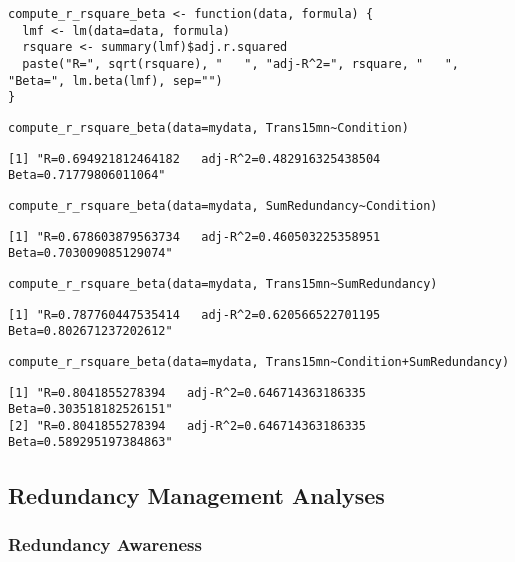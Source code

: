 \documentclass[10pt]{article}
\begin{document}
\begin{verbatim}
compute_r_rsquare_beta <- function(data, formula) {
  lmf <- lm(data=data, formula)
  rsquare <- summary(lmf)$adj.r.squared
  paste("R=", sqrt(rsquare), "   ", "adj-R^2=", rsquare, "   ", "Beta=", lm.beta(lmf), sep="")
}
\end{verbatim}

\begin{verbatim}
compute_r_rsquare_beta(data=mydata, Trans15mn~Condition)
\end{verbatim}

\begin{verbatim}
[1] "R=0.694921812464182   adj-R^2=0.482916325438504   Beta=0.71779806011064"
\end{verbatim}

\begin{verbatim}
compute_r_rsquare_beta(data=mydata, SumRedundancy~Condition)
\end{verbatim}

\begin{verbatim}
[1] "R=0.678603879563734   adj-R^2=0.460503225358951   Beta=0.703009085129074"
\end{verbatim}

\begin{verbatim}
compute_r_rsquare_beta(data=mydata, Trans15mn~SumRedundancy)
\end{verbatim}

\begin{verbatim}
[1] "R=0.787760447535414   adj-R^2=0.620566522701195   Beta=0.802671237202612"
\end{verbatim}

\begin{verbatim}
compute_r_rsquare_beta(data=mydata, Trans15mn~Condition+SumRedundancy)
\end{verbatim}

\begin{verbatim}
[1] "R=0.8041855278394   adj-R^2=0.646714363186335   Beta=0.303518182526151"
[2] "R=0.8041855278394   adj-R^2=0.646714363186335   Beta=0.589295197384863"
\end{verbatim}


\subsection{Redundancy Management Analyses}
\label{sec-2-4}

\subsubsection{Redundancy Awareness}
\label{sec-2-4-1}
\end{document}
